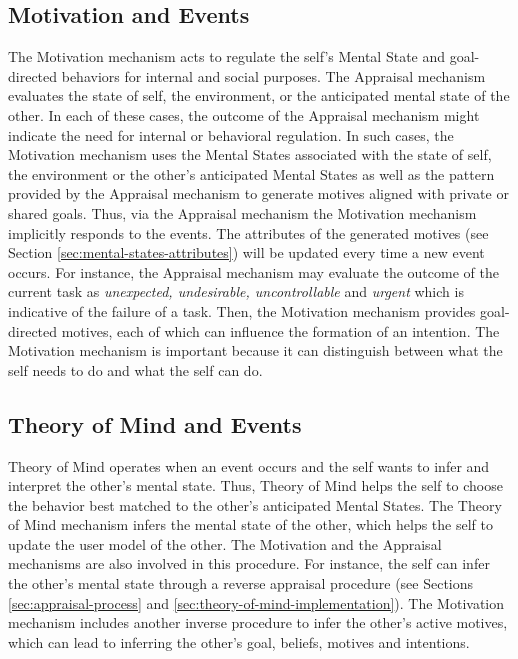 \documentclass[12pt]{report}
\begin{document}
\subsection{Motivation and Events}
The Motivation mechanism acts to regulate the self's Mental State and
goal-directed behaviors for internal and social purposes. The Appraisal mechanism
evaluates the state of self, the environment, or the anticipated mental state of
the other. In each of these cases, the outcome of the Appraisal mechanism might
indicate the need for internal or behavioral regulation. In such cases, the
Motivation mechanism uses the Mental States associated with the state of self,
the environment or the other's anticipated Mental States as well as the pattern
provided by the Appraisal mechanism to generate motives aligned with private or
shared goals. Thus, via the Appraisal mechanism the Motivation mechanism
implicitly responds to the events. The attributes of the generated motives (see
Section \ref{sec:mental-states-attributes}) will be updated every time a new
event occurs. For instance, the Appraisal mechanism may evaluate the outcome of
the current task as \textit{unexpected, undesirable, uncontrollable} and
\textit{urgent} which is indicative of the failure of a task. Then, the
Motivation mechanism provides goal-directed motives, each of which can
influence the formation of an intention. {\color{red}The Motivation mechanism
is important because it can distinguish between what the self needs to do and
what the self can do.}

\subsection{Theory of Mind and Events}
Theory of Mind operates when an event occurs and the self wants to infer and
interpret the other's mental state. Thus, Theory of Mind helps the self to
choose the behavior best matched to the other's anticipated Mental States.
The Theory of Mind mechanism infers the mental state of the other, which helps
the self to update the user model of the other. The Motivation and the Appraisal
mechanisms are also involved in this procedure. For instance, the self can infer
the other's mental state through a reverse appraisal procedure (see Sections
\ref{sec:appraisal-process} and \ref{sec:theory-of-mind-implementation}). The
Motivation mechanism includes another inverse procedure to infer the other's
active motives, which can lead to inferring the other's goal, beliefs, motives
and intentions.
\end{document}
